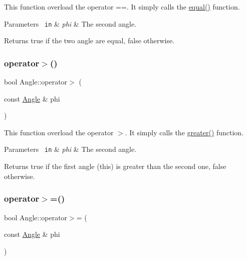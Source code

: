 This function overload the operator ==. It simply calls the {\ttfamily \mbox{\hyperlink{class_angle_a21d2e7c68957afdd5c7edf3efd3e0bdc}{equal()}}} function. 
\begin{DoxyParams}[1]{Parameters}
\mbox{\texttt{ in}}  & {\em phi} & The second angle. \\
\hline
\end{DoxyParams}
\begin{DoxyReturn}{Returns}
{\ttfamily true} if the two angle are equal, {\ttfamily false} otherwise. 
\end{DoxyReturn}
\mbox{\label{class_angle_a5c45045b213db3627055a4591b403224}} 
\subsubsection{\texorpdfstring{operator$>$()}{operator>()}}
{\footnotesize\ttfamily bool Angle\+::operator$>$ (\begin{DoxyParamCaption}\item[{const \mbox{\hyperlink{class_angle}{Angle}} \&}]{phi }\end{DoxyParamCaption})\hspace{0.3cm}{\ttfamily [inline]}}

This function overload the operator $>$. It simply calls the {\ttfamily \mbox{\hyperlink{class_angle_a2ead65678819acef29cc4c7f2400f631}{greater()}}} function. 
\begin{DoxyParams}[1]{Parameters}
\mbox{\texttt{ in}}  & {\em phi} & The second angle. \\
\hline
\end{DoxyParams}
\begin{DoxyReturn}{Returns}
{\ttfamily true} if the first angle (this) is greater than the second one, {\ttfamily false} otherwise. 
\end{DoxyReturn}
\mbox{\label{class_angle_a2cedd44bb72da23b24d2fd57eacf3b79}} 
\subsubsection{\texorpdfstring{operator$>$=()}{operator>=()}}
{\footnotesize\ttfamily bool Angle\+::operator$>$= (\begin{DoxyParamCaption}\item[{const \mbox{\hyperlink{class_angle}{Angle}} \&}]{phi }\end{DoxyParamCaption})\hspace{0.3cm}{\ttfamily [inline]}}

